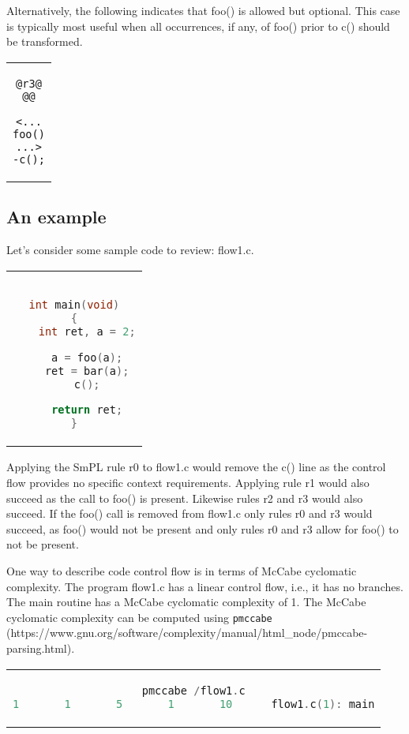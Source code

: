 Alternatively, the following indicates that foo() is allowed but optional.
This case is typically most useful when all occurrences, if any, of foo()
prior to c() should be transformed.

\begin{center}
\begin{tabular}{c}
\begin{lstlisting}[language=Cocci]
@r3@
@@

<...
foo()
...>
-c();

\end{lstlisting}\\
\end{tabular}
\end{center}

\subsection{An example}
Let's consider some sample code to review: flow1.c.

\begin{center}
\begin{tabular}{c}
\begin{lstlisting}[language=C]

int main(void)
{
	int ret, a = 2;

	a = foo(a);
	ret = bar(a);
	c();

	return ret;
}
\end{lstlisting}\\
\end{tabular}
\end{center}

Applying the SmPL rule r0 to flow1.c would remove the c() line as the control
flow provides no specific context requirements. Applying rule r1 would also
succeed as the call to foo() is present. Likewise rules r2 and r3 would also
succeed. If the foo() call is removed from flow1.c only rules r0 and r3 would
succeed, as foo() would not be present and only rules r0 and r3 allow for
foo() to not be present.

One way to describe code control flow is in terms of McCabe cyclomatic
complexity.
The program flow1.c has a linear control flow, i.e., it has no
branches. The main
routine has a McCabe cyclomatic complexity of 1. The McCabe cyclomatic
complexity can be computed using
{\tt pmccabe} (https://www.gnu.org/\-software/\-complexity/\-manual/\-html\_node/\-pmccabe-parsing.html).

\begin{center}
\begin{tabular}{c}
\begin{lstlisting}[language=C]
pmccabe /flow1.c
1       1       5       1       10      flow1.c(1): main
\end{lstlisting}\\
\end{tabular}
\end{center}

